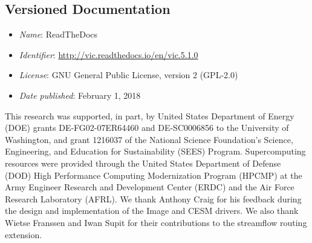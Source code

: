 \documentclass[gmd, manuscript]{copernicus}
\begin{document}
\subsection{Versioned Documentation}

\begin{itemize}
	\item \textit{Name}: ReadTheDocs
	\item \textit{Identifier}: \url{http://vic.readthedocs.io/en/vic.5.1.0}
	\item \textit{License}: GNU General Public License, version 2 (GPL-2.0)
	\item \textit{Date published}: February 1, 2018
\end{itemize}


\begin{acknowledgements}
  This research was supported, in part, by United States Department of Energy (DOE) grants DE-FG02-07ER64460 and DE-SC0006856 to the University of Washington, and grant 1216037 of the National Science Foundation's Science, Engineering, and Education for Sustainability (SEES) Program. Supercomputing resources were provided through the United States Department of Defense (DOD) High Performance Computing Modernization Program (HPCMP) at the Army Engineer Research and Development Center (ERDC) and the Air Force Research Laboratory (AFRL).  We thank Anthony Craig for his feedback during the design and implementation of the Image and CESM drivers. We also thank Wietse Franssen and Iwan Supit for their contributions to the streamflow routing extension.
\end{acknowledgements}




%
%
%



\end{document}
